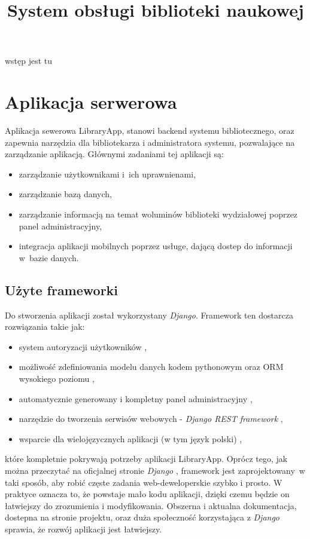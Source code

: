 \documentclass[twoside]{projektInzynierskiMS}
\title{System obsługi biblioteki naukowej}
\begin{document}
wstęp jest tu 


\section{Aplikacja serwerowa}
Aplikacja sewerowa LibraryApp, stanowi backend systemu bibliotecznego, oraz zapewnia narzędzia dla bibliotekarza i administratora systemu, pozwalające na zarządzanie aplikacją. Głównymi zadaniami tej aplikacji są:
\begin{itemize}
	\item zarządzanie użytkownikami i~ich uprawnienami,
	\item zarządzanie bazą danych,
	\item zarządzanie informacją na temat woluminów biblioteki wydziałowej poprzez panel administracyjny,
	\item integracja aplikacji mobilnych poprzez usługe, dającą dostep do informacji w~bazie danych.
\end{itemize}

\subsection{Użyte frameworki}

Do stworzenia aplikacji został wykorzystany \textit{Django}. Framework ten dostarcza rozwiązania takie jak:
\begin{itemize}
	\item system autoryzacji użytkowników \cite{DjangoAuth},
	\item możliwość zdefiniowania modelu danych kodem pythonowym oraz ORM wysokiego poziomu \cite{DjangoORM},
	\item automatycznie generowany i kompletny panel administracyjny \cite{DjangoAdmin},
	\item narzędzie do tworzenia serwisów webowych - \textit{Django REST framework} \cite{DjangoRest},
	\item wsparcie dla wielojęzycznych aplikacji (w tym język polski) \cite{DjangoTranslation},
\end{itemize}
które kompletnie pokrywają potrzeby aplikacji LibraryApp. Oprócz tego, jak można przeczytać na oficjalnej stronie \textit{Django} \cite{DjangoOfficial}, framework jest zaprojektowany~w taki sposób, aby robić częste zadania web-deweloperskie szybko i prosto. W praktyce oznacza to, że powstaje mało kodu aplikacji, dzięki czemu będzie on łatwiejszy do zrozumienia i modyfikowania. Obszerna i aktualna dokumentacja, dostepna na stronie projektu, oraz duża społeczność korzystająca z \textit{Django} sprawia, że rozwój aplikacji jest łatwiejszy.
\end{document}
